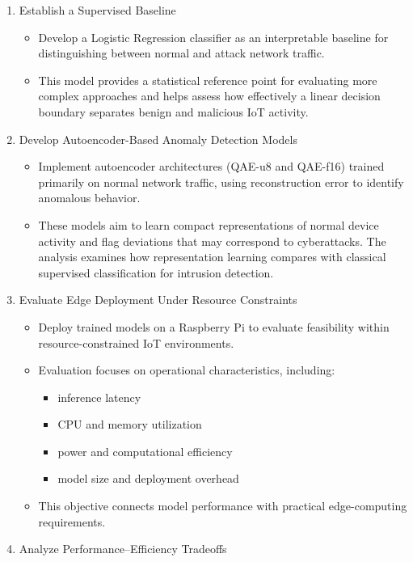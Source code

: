 \documentclass[
  8pt,
  letterpaper,
  DIV=11,
  numbers=noendperiod]{scrreprt}
\begin{document}
\begin{enumerate}
\def\labelenumi{\arabic{enumi}.}
\item
  Establish a Supervised Baseline

  \begin{itemize}
  \item
    Develop a Logistic Regression classifier as an interpretable
    baseline for distinguishing between normal and attack network
    traffic.
  \item
    This model provides a statistical reference point for evaluating
    more complex approaches and helps assess how effectively a linear
    decision boundary separates benign and malicious IoT activity.
  \end{itemize}
\item
  Develop Autoencoder-Based Anomaly Detection Models

  \begin{itemize}
  \item
    Implement autoencoder architectures (QAE-u8 and QAE-f16) trained
    primarily on normal network traffic, using reconstruction error to
    identify anomalous behavior.
  \item
    These models aim to learn compact representations of normal device
    activity and flag deviations that may correspond to cyberattacks.
    The analysis examines how representation learning compares with
    classical supervised classification for intrusion detection.
  \end{itemize}
\item
  Evaluate Edge Deployment Under Resource Constraints

  \begin{itemize}
  \item
    Deploy trained models on a Raspberry Pi to evaluate feasibility
    within resource-constrained IoT environments.
  \item
    Evaluation focuses on operational characteristics, including:

    \begin{itemize}
    \item
      inference latency
    \item
      CPU and memory utilization
    \item
      power and computational efficiency
    \item
      model size and deployment overhead
    \end{itemize}
  \item
    This objective connects model performance with practical
    edge-computing requirements.
  \end{itemize}
\item
  Analyze Performance--Efficiency Tradeoffs


\end{enumerate}
\end{document}
